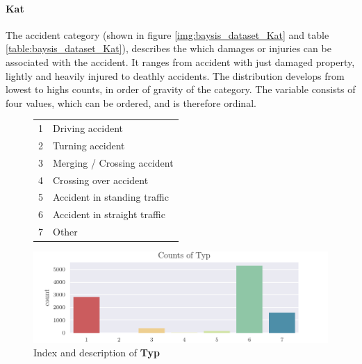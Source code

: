 \paragraph{Kat}
The accident category (shown in figure \autoref{img:baysis_dataset_Kat} and table \autoref{table:baysis_dataset_Kat}), describes the which damages or injuries can be associated with the accident. It ranges from accident with just  damaged property, lightly and heavily injured to deathly accidents. The distribution develops from lowest to highs counts, in order of gravity of the category. The variable consists of four values, which can be ordered, and is therefore ordinal.

\begin{figure}[!ht]
	\centering
	\begin{minipage}[t]{.4\textwidth} 
		\centering 	
		\begin{tabular}{c|l}  
			1 & Driving accident  \\ 
			2 & Turning accident  \\
			3 & Merging / Crossing accident  \\
			4 & Crossing over accident  \\
			5 & Accident in standing traffic  \\
			6 & Accident in straight traffic  \\
			7 & Other  \\
	   	\end{tabular}
	\end{minipage}
	\begin{minipage}[t]{.5\textwidth} 
		\centering
		\vspace*{-0.5\baselineskip}
		\includegraphics[scale=1.0]{CorrAnalysis/data/BAYSIS/01_dataset/plots/baysis_dataset_count_Typ}
	\end{minipage} 
	\caption{Index and description of \textbf{Typ}}
	\label{table:baysis_dataset_Typ}
	\label{img:baysis_dataset_Typ}
\end{figure} 
